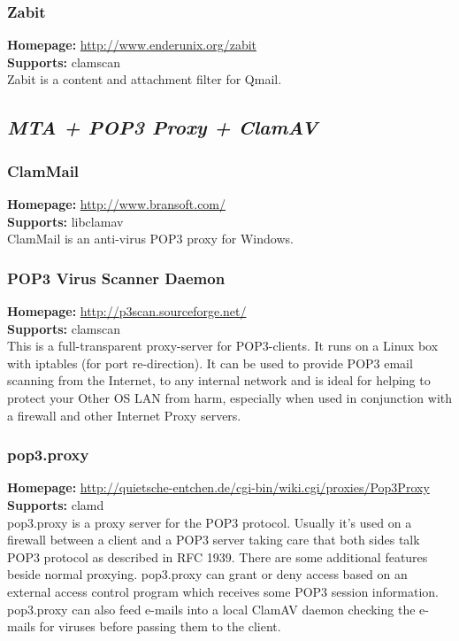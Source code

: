 \documentclass[a4paper,titlepage,12pt]{article}
\begin{document}
    \subsubsection{Zabit}
    \textbf{Homepage:} \url{http://www.enderunix.org/zabit}\\
    \textbf{Supports:} clamscan\\[4pt]
    Zabit is a content and attachment filter for Qmail.

    \subsection{\emph{MTA + POP3 Proxy + ClamAV}}

    \subsubsection{ClamMail}
    \textbf{Homepage:} \url{http://www.bransoft.com/}\\
    \textbf{Supports:} libclamav\\[4pt]
    ClamMail is an anti-virus POP3 proxy for Windows.

    \subsubsection{POP3 Virus Scanner Daemon}
    \textbf{Homepage:} \url{http://p3scan.sourceforge.net/}\\
    \textbf{Supports:} clamscan\\[4pt]
    This is a full-transparent proxy-server for POP3-clients. It runs on
    a Linux box with iptables (for port re-direction). It can be used to
    provide POP3 email scanning from the Internet, to any internal network
    and is ideal for helping to protect your Other OS LAN from harm,
    especially when used in conjunction with a firewall and other Internet
    Proxy servers.

    \subsubsection{pop3.proxy}
    \textbf{Homepage:} \url{http://quietsche-entchen.de/cgi-bin/wiki.cgi/proxies/Pop3Proxy}\\
    \textbf{Supports:} clamd\\[4pt]
     pop3.proxy is a proxy server for the POP3 protocol. Usually it's used on
     a firewall between a client and a POP3 server taking care that both sides
     talk POP3 protocol as described in RFC 1939. There are some additional
     features beside normal proxying. pop3.proxy can grant or deny access
     based on an external access control program which receives some POP3
     session information. pop3.proxy can also feed e-mails into a local
     ClamAV daemon checking the e-mails for viruses before passing them to
     the client. 
\end{document}
